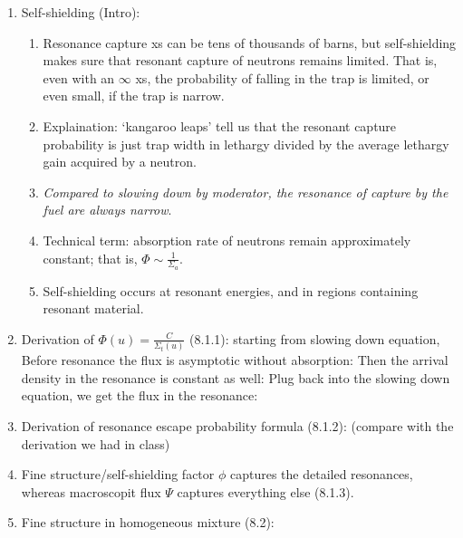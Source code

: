 \documentclass{school-22.211-notes}
\begin{document}
\clearpage
\begin{enumerate}
\item Self-shielding (Intro): 
  \begin{enumerate}
  \item Resonance capture xs can be tens of thousands of barns, but self-shielding makes sure that resonant capture of neutrons remains limited. That is, even with an $\infty$ xs, the probability of falling in the trap is limited, or even small, if the trap is narrow. 
  \item Explaination: `kangaroo leaps' tell us that the resonant capture probability is just trap width in lethargy divided by the average lethargy gain acquired by a neutron. 
  \item \textit{Compared to slowing down by moderator, the resonance of capture by the fuel are always narrow}.
  \item Technical term: absorption rate of neutrons remain approximately constant; that is, $\Phi \sim \frac{1}{\Sigma_a}$. 
  \item Self-shielding occurs at resonant energies, and in regions containing resonant material. 
  \end{enumerate}
\item Derivation of $\Phi(u)  = \frac{C}{\Sigma_t(u)}$ (8.1.1): starting from slowing down equation,
  Before resonance the flux is asymptotic without absorption:
  Then the arrival density in the resonance is constant as well:
  Plug back into the slowing down equation, we get the flux in the resonance:
\item Derivation of resonance escape probability formula (8.1.2): 
(compare with the derivation we had in class)
\item Fine structure/self-shielding factor $\phi$ captures the detailed resonances, whereas macroscopit flux $\Psi$ captures everything else (8.1.3).
\item Fine structure in homogeneous mixture (8.2):

\end{enumerate}
\end{document}

